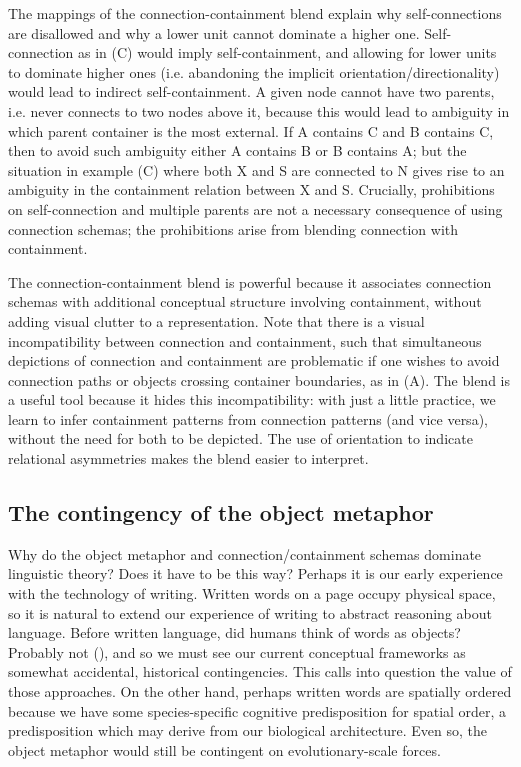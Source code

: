   The mappings of the connection-containment blend explain why self-connections are disallowed and why a lower unit cannot dominate a higher one. Self-connection as in (C) would imply self-containment, and allowing for lower units to dominate higher ones (i.e. abandoning the implicit orientation/directionality) would lead to indirect self-containment. A given node cannot have two parents, i.e. never connects to two nodes above it, because this would lead to ambiguity in which parent container is the most external. If A contains C and B contains C, then to avoid such ambiguity either A contains B or B contains A; but the situation in example {}(C) where both X and S are connected to N gives rise to an ambiguity in the containment relation between X and S. Crucially, prohibitions on self-connection and multiple parents are not a necessary consequence of using connection schemas; the prohibitions arise from blending connection with containment.

  The connection-containment blend is powerful because it associates connection schemas with additional conceptual structure involving containment, without adding visual clutter to a representation. Note that there is a visual incompatibility between connection and containment, such that simultaneous depictions of connection and containment are problematic if one wishes to avoid connection paths or objects crossing container boundaries, as in (A). The blend is a useful tool because it hides this incompatibility: with just a little practice, we learn to infer containment patterns from connection patterns (and vice versa), without the need for both to be depicted. The use of orientation to indicate relational asymmetries makes the blend easier to interpret.

\subsection{The contingency of the object metaphor}

Why do the object metaphor and connection/containment schemas dominate linguistic theory? Does it have to be this way? Perhaps it is our early experience with the technology of writing. Written words on a page occupy physical space, so it is natural to extend our experience of writing to abstract reasoning about language. Before written language, did humans think of words as objects? Probably not (\citealt{Linell1988,Linell2005,Ong2013}), and so we must see our current conceptual frameworks as somewhat accidental, historical contingencies. This calls into question the value of those approaches. On the other hand, perhaps written words are spatially ordered because we have some species-specific cognitive predisposition for spatial order, a predisposition which may derive from our biological architecture. Even so, the object metaphor would still be contingent on evolutionary-scale forces. 

